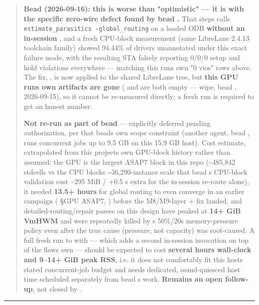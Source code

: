 \begin{record}
\begin{quote}
\warn{} \textbf{Bead  (2026-09-16): this is worse than
"optimistic" --- it is  with the specific
zero-wire defect found by bead .} That
step\textquotesingle s  calls
\texttt{estimate\_\allowbreak{}parasitics\ -\allowbreak{}global\_\allowbreak{}routing}
on a loaded ODB \textbf{without an in-session }, and
a fresh CPU-block measurement (same LibreLane 2.4.13 toolchain family)
showed 94.44\% of drivers unannotated under this exact failure mode,
with the resulting STA falsely reporting 0/0/0 setup and hold violations
everywhere --- matching this run\textquotesingle s own "0 vios" rows
above. The fix, , is now applied to
the shared LibreLane tree, but \textbf{this GPU run\textquotesingle s
own artifacts are gone} ( and
 are both empty --- 
wipe, bead , 2026-09-15), so it cannot be re-measured
directly; a fresh run is required to get an honest number.

\textbf{Not re-run as part of bead } --- explicitly deferred
pending authorization, per that bead\textquotesingle s own scope
constraint (another agent, bead , runs concurrent jobs up to
9.5 GB on this 15.9 GB host). Cost estimate, extrapolated from this
project\textquotesingle s own GPU-block history rather than assumed: the
GPU is the largest ASAP7 block in this repo (\textasciitilde485,842
stdcells vs the CPU block\textquotesingle s
\textasciitilde36,290-instance scale that bead
\textquotesingle s CPU-block validation cost
\textasciitilde295 MiB / +0.5 s extra for the in-session re-route
alone), it needed \textbf{13.5+ hours} for global routing to even
converge in an earlier campaign ( §GPU
ASAP7, ) before the
M8/\allowbreak{}M9-layer +  fix landed, and
detailed-routing/\allowbreak{}repair passes on this design have peaked
at \textbf{14+ GiB VmHWM} and were repeatedly killed by
\textquotesingle s 50\%/20s memory-pressure policy
even after the true cause (pressure, not capacity) was root-caused. A
full fresh run to  with
 --- which adds a second in-session
 invocation on top of the flow\textquotesingle s own
--- should be expected to cost \textbf{several hours wall-clock and
9--14+ GiB peak RSS}, i.e. it does not comfortably fit this
host\textquotesingle s stated concurrent-job budget and needs dedicated,
oomd-quiesced host time scheduled separately from bead
\textquotesingle s work. \textbf{Remains an open follow-up},
not closed by .
\end{quote}

\begin{center}\rule{0.5\linewidth}{0.5pt}\end{center}

\end{record}

